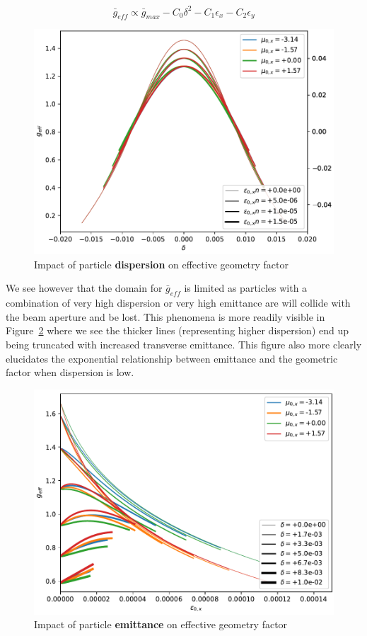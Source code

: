 $$\bar{g}_{eff} \propto \bar{g}_{max} - C_0\delta^2 - C_1\epsilon_x - C_2\epsilon_y$$

\begin{figure}
    \centering
    \includegraphics{figs/g_dispersion.pdf}
    \caption{Impact of particle \textbf{dispersion} on effective geometry factor}
    \label{fig:g_eff_dispersion}
\end{figure}

We see however that the domain for $\bar{g}_{eff}$ is limited as particles with a combination of very high dispersion or very high emittance are will collide with the beam aperture and be lost. This phenomena is more readily visible in Figure~\ref{fig:g_emittance} where we see the thicker lines (representing higher dispersion) end up being truncated with increased transverse emittance. This figure also more clearly elucidates the exponential relationship between emittance and the geometric factor when dispersion is low.

\begin{figure}
    \centering
    \includegraphics{figs/g_emittance.pdf}
    \caption{Impact of particle \textbf{emittance} on effective geometry factor}
    \label{fig:g_emittance}
\end{figure}


